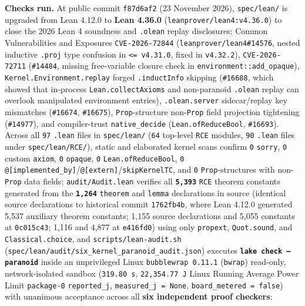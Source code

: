 \documentclass[10pt,letterpaper]{article}
\begin{document}
\textbf{Checks run.} At public commit \texttt{f87d6af2} (23 November
2026), \texttt{spec/lean/} is upgraded from Lean 4.12.0 to \textbf{Lean
4.36.0} (\texttt{leanprover/\allowbreak{}lean4:\allowbreak{}v4.36.0}) to close the 2026 Lean 4
soundness and \texttt{.olean} replay disclosures: Common Vulnerabilities
and Exposures \texttt{CVE-2026-72844} (\texttt{leanprover/\allowbreak{}lean4\#14576},
nested inductive \texttt{.proj} type confusion in \texttt{<=\ v4.31.0},
fixed in \texttt{v4.32.2}), \texttt{CVE-2026-72711} (\texttt{\#14484},
missing free-variable closure check in
\texttt{environment::\allowbreak{}add\_\allowbreak{}opaque}),
\texttt{Kernel.\allowbreak{}Environment.\allowbreak{}replay} forged \texttt{.inductInfo} skipping
(\texttt{\#16688}, which showed that in-process
\texttt{Lean.\allowbreak{}collectAxioms} and non-paranoid \texttt{.olean} replay can
overlook manipulated environment entries), \texttt{.olean.server}
sidecar/replay key mismatches (\texttt{\#16674}, \texttt{\#16675}),
\texttt{Prop}-structure non-\texttt{Prop} field projection tightening
(\texttt{\#14977}), and compiler-trust \texttt{native\_decide}
(\texttt{Lean.\allowbreak{}ofReduceBool}, \texttt{\#16693}). Across all \texttt{97}
\texttt{.lean} files in \texttt{spec/lean/} (\texttt{64} top-level
\texttt{RCE} modules, \texttt{90} \texttt{.lean} files under
\texttt{spec/lean/RCE/}), static and elaborated kernel scans confirm
\texttt{0} \texttt{sorry}, \texttt{0} custom \texttt{axiom}, \texttt{0}
\texttt{opaque}, \texttt{0} \texttt{Lean.\allowbreak{}ofReduceBool}, \texttt{0}
\texttt{@[implemented\_\allowbreak{}by]}/\allowbreak{}\texttt{@[extern]}/\allowbreak{}\texttt{skipKernelTC},
and \texttt{0} \texttt{Prop}-structures with non-\texttt{Prop} data
fields; \texttt{audit/\allowbreak{}Audit.\allowbreak{}lean} verifies all
\textbf{\texttt{5,393}} \texttt{RCE} theorem constants generated from
the \textbf{\texttt{1,264}} \texttt{theorem} and \texttt{lemma}
declarations in source (identical source declarations to historical
commit \texttt{1762fb4b}, where Lean 4.12.0 generated 5,537 auxiliary
theorem constants; 1,155 source declarations and 5,055 constants at
\texttt{0c015c43}; 1,116 and 4,877 at \texttt{e416fd0}) using only
\texttt{propext}, \texttt{Quot.sound}, and
\texttt{Classical.\allowbreak{}choice}, and
\texttt{scripts/\allowbreak{}lean-\allowbreak{}audit.\allowbreak{}sh}
(\texttt{spec/\allowbreak{}lean/\allowbreak{}audit/\allowbreak{}six\_\allowbreak{}kernel\_\allowbreak{}paranoid\_\allowbreak{}audit.\allowbreak{}json})
executes \textbf{\texttt{lake\ check\ --paranoid}} inside an
unprivileged Linux \texttt{bubblewrap\ 0.11.1} (\texttt{bwrap})
read-only, network-isolated sandbox (\texttt{319.80\ s},
\texttt{22,354.77\ J} Linux Running Average Power Limit
\texttt{package-0} \texttt{reported\_j},
\texttt{measured\_j\ =\ None}, \texttt{board\_metered\ =\ false}) with
unanimous acceptance across all \textbf{six independent proof checkers}:
\end{document}
